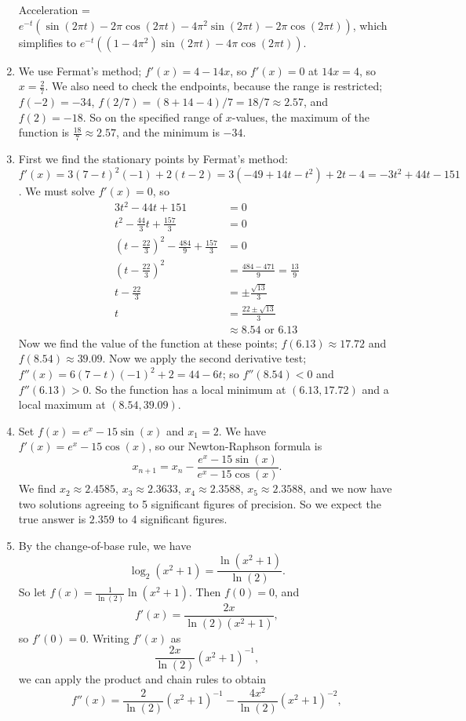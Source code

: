 \documentclass{article}
\begin{document}
\begin{enumerate}
		Acceleration = $e^{-t}\left(\sin(2\pi t)-2\pi\cos(2\pi t) -4\pi^2\sin(2\pi t)-2\pi \cos(2\pi t)\right)$, which simplifies to $e^{-t}\left((1-4\pi^2)\sin(2\pi t) - 4\pi\cos(2\pi t)\right)$.
	\item We use Fermat's method; $f'(x)=4-14x$, so $f'(x)=0$ at $14x=4$, so $x=\frac{2}{7}$. We also need to check the endpoints, because the range is restricted; $f(-2)=-34$, $f(2/7)=(8+14-4)/7=18/7\approx2.57$, and $f(2)=-18$. So on the specified range of $x$-values, the maximum of the function is $\frac{18}{7}\approx 2.57$, and the minimum is $-34$.
	\item First we find the stationary points by Fermat's method: $f'(x)=3(7-t)^2(-1)+2(t-2)=3(-49+14t-t^2)+2t-4=-3t^2+44t-151$. We must solve $f'(x)=0$, so
		\begin{align*}
			3t^2-44t+151&=0\\
			t^2-\frac{44}{3}t+\frac{157}{3}&=0\\
			\left(t-\frac{22}{3}\right)^2-\frac{484}{9}+\frac{157}{3}&=0\\
			\left(t-\frac{22}{3}\right)^2&=\frac{484-471}{9}=\frac{13}{9}\\
			t-\frac{22}{3}&=\pm\frac{\sqrt{13}}{3}\\
			t&=\frac{22\pm\sqrt{13}}{3}\\
			&\approx 8.54\mbox{ or } 6.13
		\end{align*}
		Now we find the value of the function at these points; $f(6.13)\approx 17.72$ and $f(8.54)\approx 39.09$. Now we apply the second derivative test; $f''(x)=6(7-t)(-1)^2+2=44-6t$; so $f''(8.54)<0$ and $f''(6.13)>0$. So the function has a local minimum at $(6.13,17.72)$ and a local maximum at $(8.54,39.09)$.
	\item Set $f(x)=e^x-15\sin(x)$ and $x_1=2$. We have $f'(x)=e^x-15\cos(x)$, so our Newton-Raphson formula is
		\[x_{n+1}=x_n-\frac{e^x-15\sin(x)}{e^x-15\cos(x)}.\]
		We find $x_2\approx 2.4585$, $x_3\approx 2.3633$, $x_4\approx 2.3588$, $x_5\approx 2.3588$, and we now have two solutions agreeing to 5 significant figures of precision. So we expect the true answer is $2.359$ to 4 significant figures.
	\item By the change-of-base rule, we have
		\[\log_2(x^2+1)=\frac{\ln(x^2+1)}{\ln(2)}.\]
		So let $f(x)=\frac{1}{\ln(2)}\ln(x^2+1)$. Then $f(0)=0$, and
			\[f'(x)=\frac{2x}{\ln(2)(x^2+1)},\]
			so $f'(0)=0$. Writing $f'(x)$ as
			\[\frac{2x}{\ln(2)}(x^2+1)^{-1},\]
			we can apply the product and chain rules to obtain
			\[f''(x)=\frac{2}{\ln(2)}(x^2+1)^{-1}-\frac{4x^2}{\ln(2)}(x^2+1)^{-2},\]

\end{enumerate}
\end{document}
